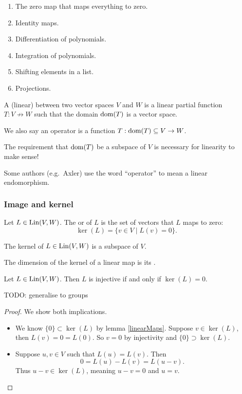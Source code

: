 \begin{example}
\begin{enumerate}
\item The zero map that maps everything to zero.
\item Identity maps.
\item Differentiation of polynomials.
\item Integration of polynomials.
\item Shifting elements in a list.
\item Projections.
\end{enumerate}

\end{example}

\begin{definition}
A (linear)  between two vector spaces $V$ and $W$ is a linear partial function $T: V \not\to W$ such that the domain $\operatorname{dom}(T)$ is a vector space.

We also say an operator is a function $T: \operatorname{dom}(T)\subseteq V\to W$.
\end{definition}
The requirement that $\operatorname{dom}(T)$ be a subspace of $V$ is necessary for linearity to make sense!

Some authors (e.g.\ Axler) use the word ``operator'' to mean a linear endomorphism.

\subsubsection{Image and kernel}
\begin{definition}
Let $L \in \operatorname{Lin}(V,W)$. The  or  of $L$ is the set of vectors that $L$ maps to zero:
\[ \ker(L) = \{ v\in V \;|\; L(v) = 0 \}. \]
\end{definition}
\begin{proposition} \label{kernelSubspace}
The kernel of $L\in \operatorname{Lin}(V,W)$ is a subspace of $V$.
\end{proposition}
\begin{definition}
The dimension of the kernel of a linear map is its .
\end{definition}
\begin{proposition} \label{injectivityKernelTriviality}
Let $L\in\operatorname{Lin}(V,W)$. Then $L$ is injective if and only if $\ker(L) = 0$.
\end{proposition}
TODO: generalise to groups
\begin{proof}
We show both implications.
\begin{itemize}
\item[\boxed{\Rightarrow}] We know $\{0\}\subset \ker(L)$ by lemma \ref{linearMaps}. Suppose $v\in \ker(L)$, then $L(v) = 0 = L(0)$. So $v=0$ by injectivity and $\{0\}\supset \ker(L)$.
\item[\boxed{\Leftarrow}] Suppose $u,v \in V$ such that $L(u)=L(v)$. Then
\[ 0 = L(u) - L(v) = L(u-v). \]
Thus $u-v\in \ker(L)$, meaning $u-v = 0$ and $u=v$.
\end{itemize}
\end{proof}

